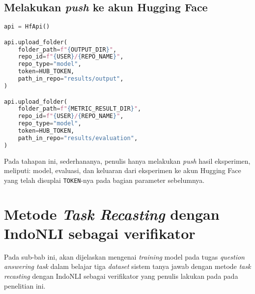 \subsection{Melakukan \emph{push} ke akun Hugging Face}
\begin{lstlisting}[language=Python, caption=Melakukan \emph{push} ke akun Hugging Face]
api = HfApi()

api.upload_folder(
    folder_path=f"{OUTPUT_DIR}",
    repo_id=f"{USER}/{REPO_NAME}",
    repo_type="model",
    token=HUB_TOKEN,
    path_in_repo="results/output",
)

api.upload_folder(
    folder_path=f"{METRIC_RESULT_DIR}",
    repo_id=f"{USER}/{REPO_NAME}",
    repo_type="model",
    token=HUB_TOKEN,
    path_in_repo="results/evaluation",
)
\end{lstlisting}

Pada tahapan ini, sederhananya, penulis hanya melakukan \emph{push} hasil eksperimen, meliputi: model, evaluasi, dan keluaran dari eksperimen ke akun Hugging Face yang telah disuplai \texttt{TOKEN}-nya pada bagian parameter sebelumnya.

\section{Metode \emph{Task Recasting} dengan IndoNLI sebagai verifikator}
Pada sub-bab ini, akan dijelaskan mengenai \emph{training} model pada tugas \emph{question answering task} dalam belajar tiga \emph{dataset} sistem tanya jawab dengan metode \emph{task recasting} dengan IndoNLI sebagai verifikator yang penulis lakukan pada pada penelitian ini.

